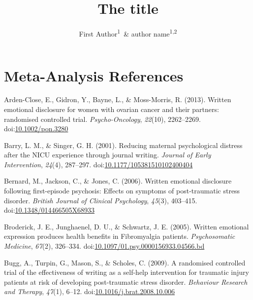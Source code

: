 \documentclass[man]{apa6}
\title{The title}
\author{First Author\textsuperscript{1}~\& author name\textsuperscript{1,2}}
\affiliation{
    \vspace{0.5cm}
          \textsuperscript{1} institution1\\
          \textsuperscript{2} institution2  }
\theoremstyle{definition}
\theoremstyle{definition}
\theoremstyle{definition}
\theoremstyle{remark}
\begin{document}
\maketitle

\setcounter{secnumdepth}{0}



\newpage
\setcounter{page}{1}

\hypertarget{meta-analysis-references}{%
\section{Meta-Analysis References}\label{meta-analysis-references}}

\setlength{\parindent}{-0.5in}
\setlength{\leftskip}{0.5in}

\hypertarget{refs}{}
\leavevmode\hypertarget{ref-Arden-Close2013}{}%
Arden-Close, E., Gidron, Y., Bayne, L., \& Moss-Morris, R. (2013).
Written emotional disclosure for women with ovarian cancer and their
partners: randomised controlled trial. \emph{Psycho-Oncology},
\emph{22}(10), 2262--2269.
doi:\href{https://doi.org/10.1002/pon.3280}{10.1002/pon.3280}

\leavevmode\hypertarget{ref-Barry2001}{}%
Barry, L. M., \& Singer, G. H. (2001). Reducing maternal psychological
distress after the NICU experience through journal writing.
\emph{Journal of Early Intervention}, \emph{24}(4), 287--297.
doi:\href{https://doi.org/10.1177/105381510102400404}{10.1177/105381510102400404}

\leavevmode\hypertarget{ref-Bernard2006}{}%
Bernard, M., Jackson, C., \& Jones, C. (2006). Written emotional
disclosure following first-episode psychosis: Effects on symptoms of
post-traumatic stress disorder. \emph{British Journal of Clinical
Psychology}, \emph{45}(3), 403--415.
doi:\href{https://doi.org/10.1348/014466505X68933}{10.1348/014466505X68933}

\leavevmode\hypertarget{ref-Broderick2005}{}%
Broderick, J. E., Junghaenel, D. U., \& Schwartz, J. E. (2005). Written
emotional expression produces health benefits in Fibromyalgia patients.
\emph{Psychosomatic Medicine}, \emph{67}(2), 326--334.
doi:\href{https://doi.org/10.1097/01.psy.0000156933.04566.bd}{10.1097/01.psy.0000156933.04566.bd}

\leavevmode\hypertarget{ref-Bugg2009}{}%
Bugg, A., Turpin, G., Mason, S., \& Scholes, C. (2009). A randomised
controlled trial of the effectiveness of writing as a self-help
intervention for traumatic injury patients at risk of developing
post-traumatic stress disorder. \emph{Behaviour Research and Therapy},
\emph{47}(1), 6--12.
doi:\href{https://doi.org/10.1016/j.brat.2008.10.006}{10.1016/j.brat.2008.10.006}
\end{document}
